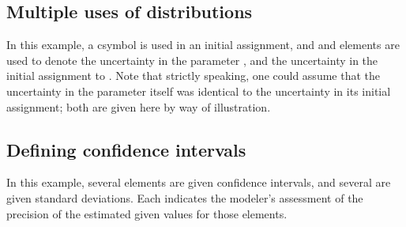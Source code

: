 \documentclass[draftspec]{sbmlpkgspec}
\newcommand{\mathml}{MathML\xspace}
\begin{document}



\subsection{Multiple uses of distributions }

In this example, a  csymbol is used in an initial assignment, and  and  elements are used to denote the uncertainty in the parameter , and the uncertainty in the initial assignment to .  Note that strictly speaking, one could assume that the uncertainty in the parameter itself was identical to the uncertainty in its initial assignment; both are given here by way of illustration.



\subsection{Defining confidence intervals }

In this example, several \Parameter elements are given confidence intervals, and several \Species are given standard deviations.  Each indicates the modeler's assessment of the precision of the estimated given values for those elements.  



\end{document}
